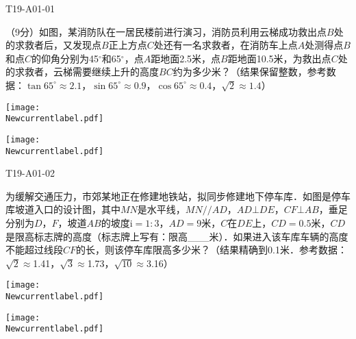 

\begin{defproblem}{T19-A01-01}%
\begin{onlyproblem}%
（9分）如图，某消防队在一居民楼前进行演习，消防员利用云梯成功救出点$B$处的求救者后，又发现点$B$正上方点$C$处还有一名求救者，在消防车上点$A$处测得点$B$和点$C$的仰角分别为45$^{\circ }$和65$^{\circ}$，点$A$距地面2.5米，点$B$距地面10.5米，为救出点$C$处的求救者，云梯需要继续上升的高度$BC$约为多少米？（结果保留整数，参考数据：$\tan65^{\circ}\approx 2.1$，$\sin65^{\circ}\approx 0.9$，$\cos65^{\circ}\approx 0.4$，$\sqrt 2 \approx 1.4$）

\vspace*{6\baselineskip}
\texttt{[image: \\Newcurrentlabel.pdf]}


\end{onlyproblem}%
\begin{onlysolution}%
\begin{center}
\texttt{[image: \\Newcurrentlabel.pdf]}
\end{center}
\end{onlysolution}%
\end{defproblem}



\begin{defproblem}{T19-A01-02}%
\begin{onlyproblem}%
为缓解交通压力，市郊某地正在修建地铁站，拟同步修建地下停车库．如图是停车库坡道入口的设计图，其中$MN$是水平线，$MN// AD$，$AD\bot DE$，$CF\bot AB$，垂足分别为$D$，$F$，坡道$AB$的坡度i$=1:3$，$AD=9$米，$C$在$DE$上，$CD=0.5$米，$CD$是限高标志牌的高度（标志牌上写有：限高{\_}{\_}{\_}米）．如果进入该车库车辆的高度不能超过线段$CF$的长，则该停车库限高多少米？（结果精确到0.1米．参考数据：$\sqrt 2 \approx $1.41，$\sqrt 3 \approx $1.73，$\sqrt {10} \approx $3.16）

\vspace*{5\baselineskip}
\texttt{[image: \\Newcurrentlabel.pdf]}


\end{onlyproblem}%
\begin{onlysolution}%
\begin{center}
\texttt{[image: \\Newcurrentlabel.pdf]}
\end{center}
\end{onlysolution}%
\end{defproblem}


